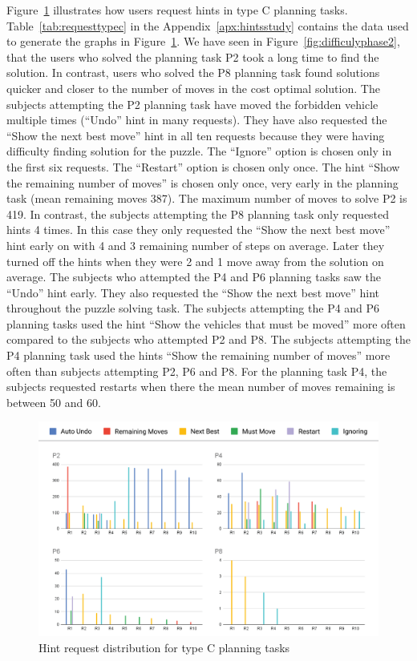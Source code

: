 Figure~\ref{fig:requesttypec} illustrates how users request hints in type C planning tasks.
Table~\ref{tab:requesttypec} in the Appendix~\ref{apx:hintsstudy} contains the data used to generate the graphs in Figure~\ref{fig:requesttypec}.
We have seen in Figure~\ref{fig:difficulyphase2}, that the users who solved the planning task P2 took a long time to find the solution.
In contrast, users who solved the P8 planning task found solutions quicker and closer to the number of moves in the cost optimal solution.
The subjects attempting the P2 planning task have moved the forbidden vehicle multiple times (``Undo'' hint in many requests).
They have also requested the ``Show the next best move'' hint in all ten requests because they were having difficulty finding solution for the puzzle.
The ``Ignore'' option is chosen only in the first six requests.
The ``Restart'' option is chosen only once.
The hint ``Show the remaining number of moves'' is chosen only once, very early in the planning task (mean remaining moves 387). 
The maximum number of moves to solve P2 is 419.
In contrast, the subjects attempting the P8 planning task only requested hints 4 times.
In this case they only requested the ``Show the next best move'' hint early on with 4 and 3 remaining number of steps on average.
Later they turned off the hints when they were 2 and 1 move away from the solution on average.
The subjects who attempted the P4 and P6 planning tasks saw the ``Undo'' hint early.
They also requested the ``Show the next best move'' hint throughout the puzzle solving task.
The subjects attempting the P4 and P6 planning tasks used the hint ``Show the vehicles that must be moved'' more often compared to the subjects who attempted P2 and P8.
The subjects attempting the P4 planning task used the hints ``Show the remaining number of moves'' more often than subjects attempting P2, P6 and P8.
For the planning task P4, the subjects requested restarts when there the mean number of moves remaining is between 50 and 60. 
\begin{figure}[tpb]
  \centering
\includegraphics[width=\columnwidth]{img/requesttypec.png}
  \caption{Hint request distribution for type C planning tasks}
  \label{fig:requesttypec}
\end{figure}


